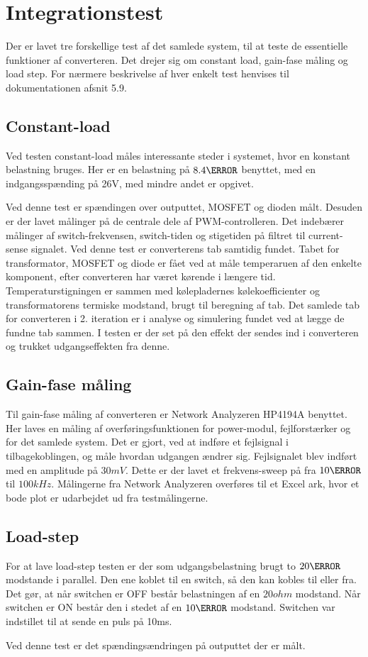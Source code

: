 

\section{Integrationstest} \label{Integrationstest}
Der er lavet tre forskellige test af det samlede system, til at teste de essentielle funktioner af converteren. Det drejer sig om constant load, gain-fase måling og load step. For nærmere beskrivelse af hver enkelt test henvises til dokumentationen afsnit 5.9.

\subsection{Constant-load}
Ved testen constant-load måles interessante steder i systemet, hvor en konstant belastning bruges. Her er en belastning på $8.4\ohm$ benyttet, med en indgangsspænding på 26V, med mindre andet er opgivet.

Ved denne test er spændingen over outputtet, MOSFET og dioden målt. Desuden er der lavet målinger på de centrale dele af PWM-controlleren. Det indebærer målinger af switch-frekvensen, switch-tiden og stigetiden på filtret til current-sense signalet.  
Ved denne test er converterens tab samtidig fundet. Tabet for transformator, MOSFET og diode er fået ved at måle temperaruen af den enkelte komponent, efter converteren har været kørende i længere tid. Temperaturstigningen er sammen med kølepladernes kølekoefficienter og transformatorens termiske modstand, brugt til beregning af tab. Det samlede tab for converteren i 2. iteration er i analyse og simulering fundet ved at lægge de fundne tab sammen. I testen er der set på den effekt der sendes ind i converteren og trukket udgangseffekten fra denne.

\subsection{Gain-fase måling}
Til gain-fase måling af converteren er Network Analyzeren HP4194A\cite{hp4194} benyttet. Her laves en måling af overføringsfunktionen for power-modul, fejlforstærker og for det samlede system. Det er gjort, ved at indføre et fejlsignal i tilbagekoblingen, og måle hvordan udgangen ændrer sig. Fejlsignalet blev indført med en amplitude på $30mV$. Dette er der lavet et frekvens-sweep på fra $10\Hz$ til $100kHz$. Målingerne fra Network Analyzeren overføres til et Excel ark, hvor et bode plot er udarbejdet ud fra testmålingerne. 

\subsection{Load-step}
For at lave load-step testen er der som udgangsbelastning brugt to $20\ohm$ modstande i parallel. Den ene koblet til en switch, så den kan kobles til eller fra. Det gør, at når switchen er OFF består belastningen af en $20ohm$ modstand. Når switchen er ON består den i stedet af en $10\ohm$ modstand. Switchen var indstillet til at sende en puls på 10ms.

\noindent Ved denne test er det spændingsændringen på outputtet der er målt.
